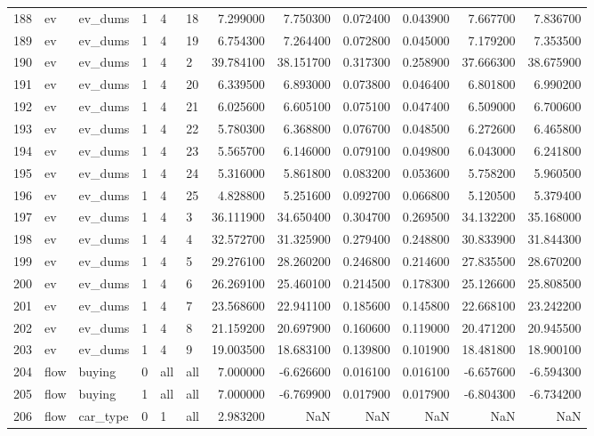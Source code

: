 \begin{tabular}{llllllrrrrrr}
188 & ev & ev_dums & 1 & 4 & 18 & 7.299000 & 7.750300 & 0.072400 & 0.043900 & 7.667700 & 7.836700 \\
189 & ev & ev_dums & 1 & 4 & 19 & 6.754300 & 7.264400 & 0.072800 & 0.045000 & 7.179200 & 7.353500 \\
190 & ev & ev_dums & 1 & 4 & 2 & 39.784100 & 38.151700 & 0.317300 & 0.258900 & 37.666300 & 38.675900 \\
191 & ev & ev_dums & 1 & 4 & 20 & 6.339500 & 6.893000 & 0.073800 & 0.046400 & 6.801800 & 6.990200 \\
192 & ev & ev_dums & 1 & 4 & 21 & 6.025600 & 6.605100 & 0.075100 & 0.047400 & 6.509000 & 6.700600 \\
193 & ev & ev_dums & 1 & 4 & 22 & 5.780300 & 6.368800 & 0.076700 & 0.048500 & 6.272600 & 6.465800 \\
194 & ev & ev_dums & 1 & 4 & 23 & 5.565700 & 6.146000 & 0.079100 & 0.049800 & 6.043000 & 6.241800 \\
195 & ev & ev_dums & 1 & 4 & 24 & 5.316000 & 5.861800 & 0.083200 & 0.053600 & 5.758200 & 5.960500 \\
196 & ev & ev_dums & 1 & 4 & 25 & 4.828800 & 5.251600 & 0.092700 & 0.066800 & 5.120500 & 5.379400 \\
197 & ev & ev_dums & 1 & 4 & 3 & 36.111900 & 34.650400 & 0.304700 & 0.269500 & 34.132200 & 35.168000 \\
198 & ev & ev_dums & 1 & 4 & 4 & 32.572700 & 31.325900 & 0.279400 & 0.248800 & 30.833900 & 31.844300 \\
199 & ev & ev_dums & 1 & 4 & 5 & 29.276100 & 28.260200 & 0.246800 & 0.214600 & 27.835500 & 28.670200 \\
200 & ev & ev_dums & 1 & 4 & 6 & 26.269100 & 25.460100 & 0.214500 & 0.178300 & 25.126600 & 25.808500 \\
201 & ev & ev_dums & 1 & 4 & 7 & 23.568600 & 22.941100 & 0.185600 & 0.145800 & 22.668100 & 23.242200 \\
202 & ev & ev_dums & 1 & 4 & 8 & 21.159200 & 20.697900 & 0.160600 & 0.119000 & 20.471200 & 20.945500 \\
203 & ev & ev_dums & 1 & 4 & 9 & 19.003500 & 18.683100 & 0.139800 & 0.101900 & 18.481800 & 18.900100 \\
204 & flow & buying & 0 & all & all & 7.000000 & -6.626600 & 0.016100 & 0.016100 & -6.657600 & -6.594300 \\
205 & flow & buying & 1 & all & all & 7.000000 & -6.769900 & 0.017900 & 0.017900 & -6.804300 & -6.734200 \\
206 & flow & car_type & 0 & 1 & all & 2.983200 & NaN & NaN & NaN & NaN & NaN \\

\end{tabular}
